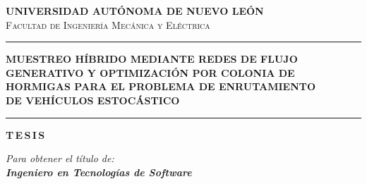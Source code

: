 \documentclass[12pt]{report}
\begin{document}
\begin{titlepage}
\pagecolor{white}


\vspace*{0.5cm}

\begin{center}

{\fontsize{15.5}{19}\selectfont\bfseries\textcolor{uanlblue}{%
  UNIVERSIDAD AUT\'ONOMA DE NUEVO LE\'ON}}\\[0.3cm]
{\fontsize{11.5}{14}\selectfont\textsc{\textcolor{uanlblue}{%
  Facultad de Ingenier\'ia Mec\'anica y El\'ectrica}}}

\vspace{0.6cm}
{\color{uanlgold}\rule{0.55\textwidth}{1.6pt}}
\vspace{0.8cm}

{\fontsize{13.0}{18}\selectfont\bfseries\textcolor{uanlblue}{%
  MUESTREO H\'IBRIDO MEDIANTE REDES DE FLUJO\\[0.2cm]
  GENERATIVO Y OPTIMIZACI\'ON POR COLONIA DE\\[0.2cm]
  HORMIGAS PARA EL PROBLEMA DE ENRUTAMIENTO\\[0.2cm]
  DE VEH\'ICULOS ESTOC\'ASTICO}}

\vspace{0.8cm}
{\color{uanlgold}\rule{0.55\textwidth}{1.6pt}}
\vspace{1.0cm}

{\fontsize{16}{20}\selectfont\bfseries\textcolor{uanlblue}{%
  T\,E\,S\,I\,S}}

\vspace{0.2cm}
{\fontsize{11}{14}\selectfont\textit{Para obtener el t\'itulo de:}}\\[0.45cm]
{\fontsize{13.5}{17}\selectfont\bfseries\textit{%
  Ingeniero en Tecnolog\'ias de Software}}

\vspace{0.5cm}


\end{center}
\end{titlepage}
\end{document}
